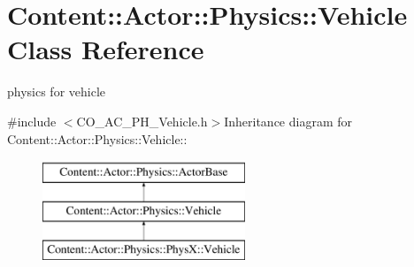 \hypertarget{classContent_1_1Actor_1_1Physics_1_1Vehicle}{
\section{Content::Actor::Physics::Vehicle Class Reference}
\label{classContent_1_1Actor_1_1Physics_1_1Vehicle}
}


physics for vehicle  


{\ttfamily \#include $<$CO\_\-AC\_\-PH\_\-Vehicle.h$>$}Inheritance diagram for Content::Actor::Physics::Vehicle::\begin{figure}[H]
\begin{center}
\leavevmode
\includegraphics[height=3cm]{classContent_1_1Actor_1_1Physics_1_1Vehicle}
\end{center}
\end{figure}
